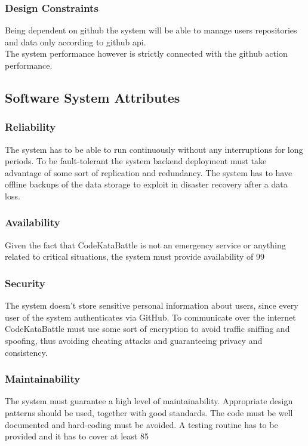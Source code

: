 \documentclass{article}
\begin{document}
\subsubsection{Design Constraints}
Being dependent on github the system will be able to manage users repositories and data only according to github api.\\
The system performance however is strictly connected with the github action performance.

\subsection{Software System Attributes}

\subsubsection{Reliability}
The system has to be able to run continuously without any interruptions for long periods. To be fault-tolerant the system backend deployment must take advantage of some sort of replication and redundancy. The system has to have offline backups of the data storage to exploit in disaster recovery after a data loss.					
\subsubsection{Availability}					
Given the fact that CodeKataBattle is not an emergency service or anything related to critical situations, the system must provide availability of 99%
\subsubsection{Security}					
The system doesn’t store sensitive personal information about users, since every user of the system authenticates via GitHub. To communicate over the internet CodeKataBattle must use some sort of encryption to avoid traffic sniffing and spoofing, thus avoiding cheating attacks and guaranteeing privacy and consistency.				
\subsubsection{Maintainability}				
The system must guarantee a high level of maintainability. Appropriate design patterns should be used, together with good standards. The code must be well documented and hard-coding must be avoided. A testing routine has to be provided and it has to cover at least 85%
\end{document}
